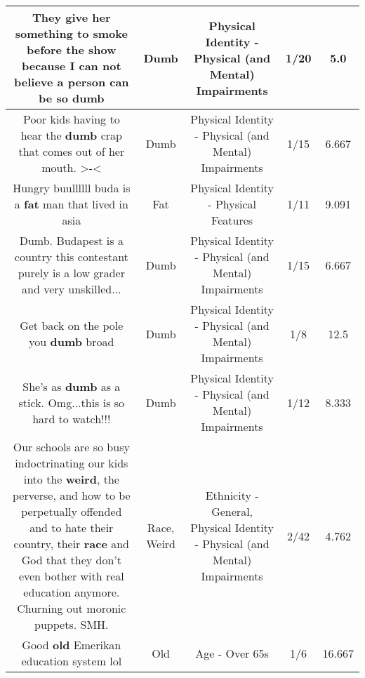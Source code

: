 \documentclass[11pt]{article}
\newlength\mylength
\begin{document}
\begin{center}
\begin{longtable}{|C{.65\mylength}|C{.30\mylength}|C{.12\mylength}|C{.12\mylength}|C{.12\mylength}|}
  \small They give her something to smoke before the show because I can not believe a person can be so dumb\normalsize   & Dumb & Physical Identity - Physical (and Mental) Impairments & 1/20 & 5.0 \\  \hline
  \small Poor kids having to hear the \textbf{dumb} crap that comes out of her mouth. >-<\normalsize   & Dumb & Physical Identity - Physical (and Mental) Impairments & 1/15 & 6.667 \\  \hline
  \small Hungry buullllll buda is a \textbf{fat} man that lived in asia\normalsize   & Fat & Physical Identity - Physical Features & 1/11 & 9.091 \\  \hline
  \small Dumb. Budapest is a country this contestant purely is a low grader and very unskilled...\normalsize   & Dumb & Physical Identity - Physical (and Mental) Impairments & 1/15 & 6.667 \\  \hline
  \small Get back on the pole you \textbf{dumb} broad\normalsize   & Dumb & Physical Identity - Physical (and Mental) Impairments & 1/8 & 12.5 \\  \hline
  \small She's as \textbf{dumb} as a stick.  Omg...this is so hard to watch!!!\normalsize   & Dumb & Physical Identity - Physical (and Mental) Impairments & 1/12 & 8.333 \\  \hline
  \small Our schools are so busy indoctrinating our kids into the \textbf{weird}, the perverse, and how to be perpetually offended and to hate their country, their \textbf{race} and God that they don't even bother with real education anymore.  Churning out moronic puppets.  SMH.\normalsize   & Race, Weird & Ethnicity - General, Physical Identity - Physical (and Mental) Impairments & 2/42 & 4.762 \\  \hline
  \small Good \textbf{old} Emerikan education system lol\normalsize   & Old & Age - Over 65s & 1/6 & 16.667 \\  \hline

\end{longtable}
\end{center}
\end{document}
